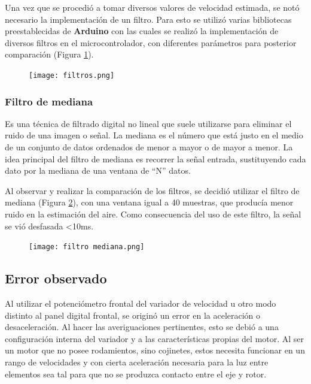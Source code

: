 Una vez que se procedió a tomar diversos valores de velocidad estimada, se notó necesario la implementación
de un filtro. Para esto se utilizó varias bibliotecas preestablecidas de \textbf{Arduino} con las cuales se realizó la implementación de diversos filtros en el microcontrolador, con diferentes parámetros para posterior comparación (Figura \ref{fig:filtros}).


\begin{figure}[H]
	\centering
	\texttt{[image: filtros.png]}
	\label{fig:filtros}
\end{figure}


\subsubsection{Filtro de mediana}
\begin{tcolorbox}[colback=blue!5!white,colframe=blue!75!black,title=Mediana]
	Es una técnica de filtrado digital no lineal que suele utilizarse para eliminar el ruido de una imagen o señal. La mediana es el número que está justo en el medio de un conjunto de datos ordenados de menor a mayor o de mayor a menor.
	La idea principal del filtro de mediana es recorrer la señal entrada, sustituyendo cada dato por la mediana de una ventana de “N” datos.
\end{tcolorbox}

Al observar y realizar la comparación de los filtros, se decidió utilizar el filtro de mediana (Figura \ref{fig:filtrosm}), con una ventana igual a 
40 muestras, que producía menor ruido en la estimación del aire. Como consecuencia del uso de este filtro, la señal se vió desfasada <10ms.

\begin{figure}[H]
	\centering
	\texttt{[image: filtro mediana.png]}
	\label{fig:filtrosm}
\end{figure}



\subsection{Error observado}
Al utilizar el potenciómetro frontal del variador de velocidad u otro modo distinto al panel digital frontal, se originó un error en la aceleración o desaceleración.  Al hacer las averiguaciones pertinentes, esto se debió a una configuración interna del
variador y a las características propias del motor. Al ser un motor que no posee rodamientos, sino cojinetes, estos necesita funcionar en un rango de velocidades y con cierta aceleración necesaria para la luz entre elementos sea tal para que no se produzca contacto entre el eje y rotor.


